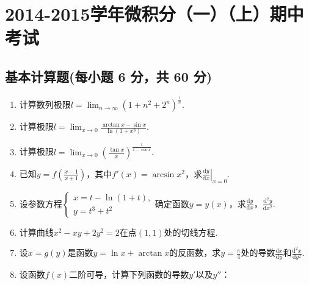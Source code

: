 \documentclass[../main.tex]{subfiles}
\begin{document}
\chapter{2014-2015学年微积分（一）（上）期中考试}

\section{基本计算题(每小题 6 分，共 60 分)}
\begin{enumerate}
    \item 计算数列极限$l=\lim_{n\to\infty}\left(1+n^{2}+2^{n}\right)^{\frac{1}{n}}$.
          \vspace{11em}

    \item 计算极限$l=\lim_{x\to 0}\frac{\arctan x-\sin x}{\ln(1+x^{3})}$.
          \vspace{11em}

    \item 计算极限$l=\lim_{x\to 0}\left(\frac{\tan x}{x}\right)^{\frac{1}{1-\cos
                      x}}$.
          \vspace{11em}

    \item 已知$y=f\left(\frac{x-1}{x+1}\right)$，其中$f'(x)=\arcsin x^{2}$，求$\left
              .\frac{\mathrm{d}y}{\mathrm{d}x}\right|_{x=0}$.
          \vspace{9em}

    \item 设参数方程$\begin{cases}
                  x=t-\ln(1+t), \\
                  y=t^{3}+t^{2}
              \end{cases}$确定函数$y=y(x)$，求$\frac{\mathrm{d}y}{\mathrm{d}x}$，$\frac{\mathrm{d}^{2}
                  y}{\mathrm{d}x^{2}}$.
          \vspace{9em}

    \item 计算曲线$x^{2}-xy+2y^{2}=2$在点$(1,1)$处的切线方程.
          \vspace{9em}

    \item 设$x=g(y)$是函数$y=\ln x+\arctan x$的反函数，求$y=\frac{\pi}{4}$处的导数$\frac{\mathrm{d}x}{\mathrm{d}y}$和$\frac{\mathrm{d}^{2}
                  x}{\mathrm{d}y^{2}}$.
          \vspace{9em}

    \item 设函数$f(x)$二阶可导，计算下列函数的导数$y'$以及$y''$：


\end{enumerate}
\end{document}
